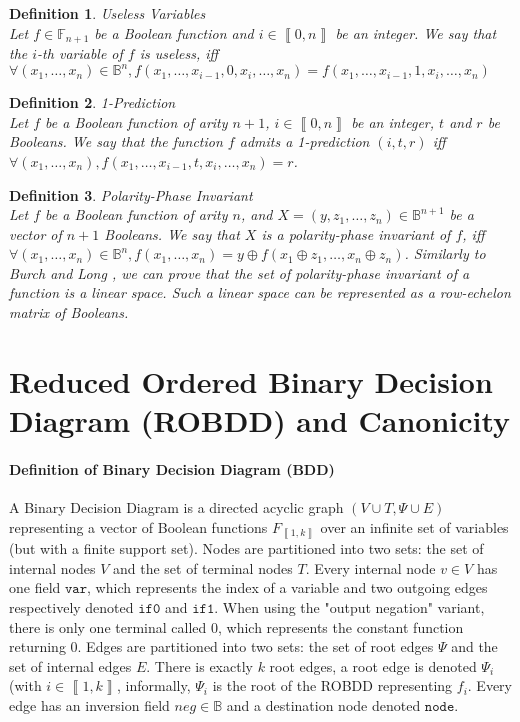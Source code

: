 \documentclass[a4paper,10pt]{article}
\newcommand{\B}{\mathbb{B}}
\newcommand{\F}{\mathbb{F}}
\newcommand{\fieldVar}{\texttt{var}}
\newcommand{\fieldNode}{\texttt{node}}
\newcommand{\fieldThen}{\mathtt{if1}}
\newcommand{\fieldElse}{\mathtt{if0}}
\newcommand{\bras}[1]{{\left\llbracket{#1}\right\rrbracket}}
\newtheorem{newdef}{Definition}
\newcommand{\definition}[2]{\begin{newdef}{#1\\}#2\end{newdef}}
\begin{document}
\definition{Useless Variables}
{
Let $f\in\F_{n+1}$ be a Boolean function and $i\in\bras{0, n}$ be an integer.
We say that the $i$-th variable of $f$ is useless, iff $\forall (x_1, \dots, x_n)\in\B^n, f(x_1, \dots, x_{i-1}, 0, x_i, \dots, x_n) = f(x_1, \dots, x_{i-1}, 1, x_i, \dots, x_n)$
}

\definition{1-Prediction}
{
Let $f$ be a Boolean function of arity $n+1$, $i\in\bras{0, n}$ be an integer, $t$ and $r$ be Booleans.
We say that the function $f$ admits a 1-prediction $(i, t, r)$ iff $\forall (x_1, \dots, x_n), f(x_1, \dots, x_{i-1}, t, x_i, \dots, x_n) = r$.
}

\definition{Polarity-Phase Invariant}
{
Let $f$ be a Boolean function of arity $n$, and $X=(y, z_1, \dots, z_n)\in\B^{n+1}$ be a vector of $n+1$ Booleans.
We say that $X$ is a polarity-phase invariant of $f$, iff $\forall (x_1, \dots, x_n)\in\B^n, f(x_1, \dots, x_n) = y\oplus{}f(x_1\oplus{}z_1, \dots, x_n\oplus{}z_n)$.
Similarly to Burch and Long \cite{BurchLong1992}, we can prove that the set of polarity-phase invariant of a function is a linear space.
Such a linear space can be represented as a row-echelon matrix of Booleans.
}

\section{Reduced Ordered Binary Decision Diagram (ROBDD) and Canonicity}

\paragraph{Definition of Binary Decision Diagram (BDD)\\}

A Binary Decision Diagram is a directed acyclic graph $(V\cup T, \Psi \cup E)$ representing a vector of Boolean functions $F_\bras{1, k}$ over an infinite set of variables (but with a finite support set).
Nodes are partitioned into two sets: the set of internal nodes $V$ and the set of terminal nodes $T$.
Every internal node $v\in V$ has one field $\fieldVar{}$, which represents the index of a variable and two outgoing edges respectively denoted $\fieldElse{}$ and $\fieldThen{}$.
When using the "output negation" variant, there is only one terminal called 0, which represents the constant function returning 0.
Edges are partitioned into two sets: the set of root edges $\Psi$ and the set of internal edges $E$.
There is exactly $k$ root edges, a root edge is denoted $\Psi_i$ (with $i\in\bras{1, k}$, informally, $\Psi_i$ is the root of the ROBDD representing $f_i$.
Every edge has an inversion field $neg\in\B$ and a destination node denoted $\fieldNode{}$.
\end{document}

